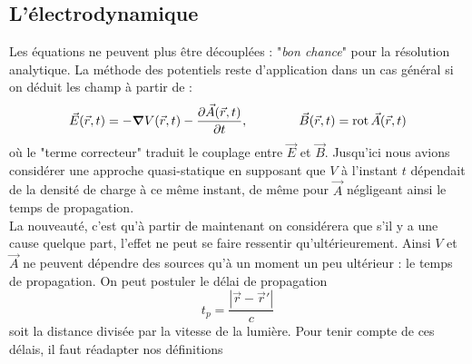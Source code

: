 \subsection{L'électrodynamique}
Les équations ne peuvent plus être découplées : "\textit{bon chance}" pour la résolution 
analytique. La méthode des potentiels reste d'application dans un cas général si on déduit 
les champ à partir de :
\begin{equation}
\vec{E}(\vec{r},t) = -\grad V(\vec{r},t)-\dfrac{\partial\vec{A}(\vec{r},t)}{\partial t},\qquad\qquad
\vec{B}(\vec{r},t) = \text{rot}\, \vec{A}(\vec{r},t)
\end{equation}
où le "terme correcteur" traduit le couplage entre $\vec{E}$ et $\vec{B}$. Jusqu'ici nous 
avions considérer une approche quasi-statique en supposant que $V$ à l'instant 
$t$ dépendait de la densité de charge à ce même instant, de même pour $\vec{A}$ négligeant 
ainsi le temps de propagation.\\

La nouveauté, c'est qu'à partir de maintenant on considérera que s'il y a une cause quelque 
part, l'effet ne peut se faire ressentir qu'ultérieurement. Ainsi $V$ et $\vec{A}$ ne peuvent 
dépendre des sources qu'à un moment un peu ultérieur : le temps de propagation. On peut 
postuler le délai de propagation
\begin{equation}
t_p = \dfrac{|\vec{r}-\vec{r}'|}{c}
\end{equation}
soit la distance divisée par la vitesse de la lumière. Pour tenir compte de ces délais, 
il faut réadapter nos définitions \\

